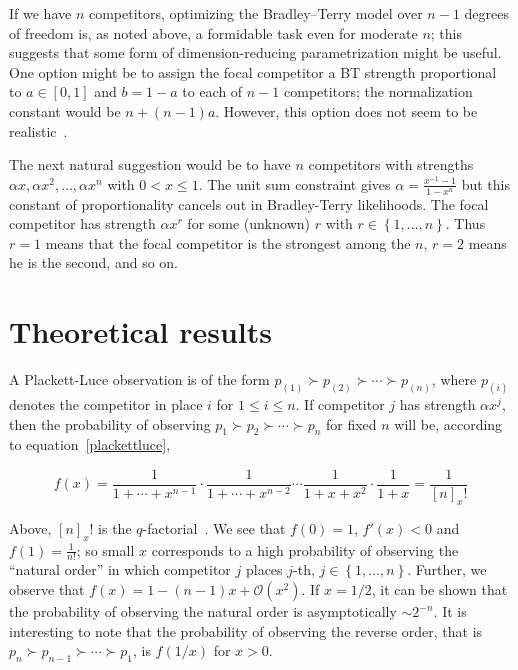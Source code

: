 \documentclass[article]{ajs}  %
\begin{document}
If we have $n$ competitors, optimizing the Bradley--Terry model over
$n-1$ degrees of freedom is, as noted above, a formidable task even
for moderate $n$; this suggests that some form of dimension-reducing
parametrization might be useful.  One option might be to assign the
focal competitor a BT strength proportional to $a\in [0,1]$ and
$b=1-a$ to each of $n-1$ competitors; the normalization constant would
be $n+(n-1)a$.  However, this option does not seem to be
realistic~\citep{kuenzer2025}.

The next natural suggestion would be to have $n$ competitors with
strengths $\alpha x,\alpha x^2,\ldots, \alpha x^{n}$ with $0 <
x\leqslant 1$.  The unit sum constraint gives
$\alpha=\frac{x^{-1}-1}{1-x^n}$ but this constant of proportionality
cancels out in Bradley-Terry likelihoods.  The focal competitor has
strength $\alpha x^{r}$ for some (unknown) $r$ with $r\in\left\lbrace
1,\ldots,n\right\rbrace$.  Thus $r=1$ means that the focal competitor
is the strongest among the $n$, $r=2$ means he is the second, and so
on.

\section{Theoretical results}

A Plackett-Luce observation is of the form $p_{(1)}\succ
p_{(2)}\succ\cdots\succ p_{(n)}$, where $p_{(i)}$ denotes the
competitor in place $i$ for $1\leqslant i\leqslant n$.  If competitor
$j$ has strength $\alpha x^{j}$, then the probability of observing
$p_1\succ p_2\succ\cdots\succ p_n$ for fixed $n$ will be, according to
equation~\ref{plackettluce},

\begin{equation}
f(x)=\frac{1}{1+\cdots+x^{n-1}}\cdot
\frac{1}{1+\cdots+x^{n-2}}\cdots
\frac{1}{1+x+x^{2}}\cdot\frac{1}{1+x}=
\frac{1}{[n]_x!}
\end{equation}

Above, $[n]_x!$ is the $q$-factorial~\citep{gasper2004}.  We see that
$f(0)=1$, $f'(x)<0$ and $f(1)=\frac{1}{n!}$; so small $x$ corresponds
to a high probability of observing the ``natural order'' in which
competitor $j$ places $j$-th, $j\in\left\lbrace
1,\ldots,n\right\rbrace$.  Further, we observe that $f(x)=1-(n-1)x +
{\mathcal O}(x^2)$.  If $x=1/2$, it can be shown that the probability
of observing the natural order is asymptotically $\sim 2^{-n}$.  It is
interesting to note that the probability of observing the reverse
order, that is $p_n\succ p_{n-1}\succ\cdots\succ p_1$, is $f(1/x)$ for
$x>0$.
\end{document}
